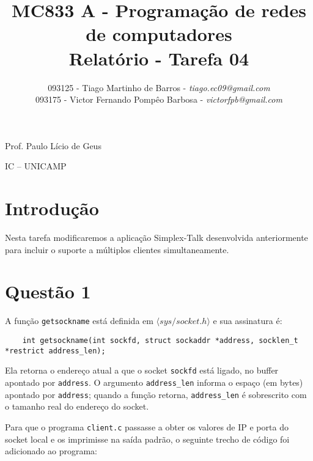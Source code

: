 \documentclass[a4paper,10pt]{article}
\begin{document}


\title{MC833 A - Programação de redes de computadores\\
Relatório - Tarefa 04}

\author {   093125 - Tiago Martinho de Barros - \textit{tiago.ec09@gmail.com}\\
            093175 - Victor Fernando Pompêo Barbosa - \textit{victorfpb@gmail.com}}


\maketitle

\centerline{Prof. Paulo Lício de Geus}
\centerline{IC -- UNICAMP}

\vspace{2cm}
\tableofcontents
    
\newpage
\section{Introdução}
\hspace{14pt}

    Nesta tarefa modificaremos a aplicação Simplex-Talk desenvolvida anteriormente para incluir o suporte a múltiplos clientes simultaneamente.

\section{Questão 1}
A função {\tt getsockname} está definida em $\langle sys/socket.h \rangle$ e sua assinatura é:
    \begin{lstlisting}
    int getsockname(int sockfd, struct sockaddr *address, socklen_t *restrict address_len);
    \end{lstlisting}

Ela retorna o endereço atual a que o socket {\tt sockfd} está ligado, no buffer apontado por {\tt address}. O argumento {\tt address\_len} informa o espaço (em bytes) apontado por {\tt address}; quando a função retorna, {\tt address\_len} é sobrescrito com o tamanho real do endereço do socket.

Para que o programa {\tt client.c} passasse a obter os valores de IP e porta do socket local e os imprimisse na saída padrão, o seguinte trecho de código foi adicionado ao programa:
\end{document}
